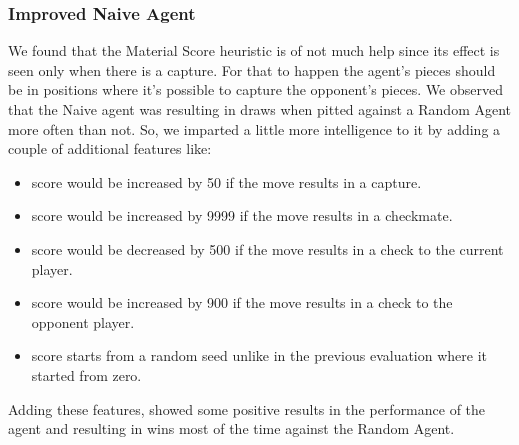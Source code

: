 \documentclass[12pt]{article}
\begin{document}
\subsubsection{Improved Naive Agent}
We found that the Material Score heuristic is of not much help since its effect is seen only when there is a capture. For that to happen the agent's pieces should be in positions where it's possible to capture the opponent's pieces. We observed that the Naive agent was resulting in draws when pitted against a Random Agent more often than not. So, we imparted a little more intelligence to it by adding a couple of additional features like:
\begin{itemize}
\item score would be increased by 50 if the move results in a capture.
\item score would be increased by 9999 if the move results in a checkmate.
\item score would be decreased by 500  if the move results in a check to the current player.
\item score would be increased by 900 if the move results in a check to the opponent player.
\item score starts from a random seed unlike in the previous evaluation where it started from zero.
\end{itemize}
Adding these features, showed some positive results in the performance of the agent and resulting
in wins most of the time against the Random Agent.
\end{document}
